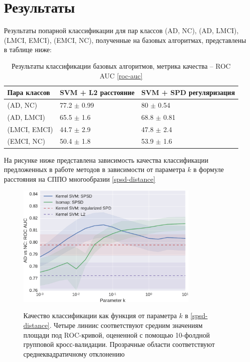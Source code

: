 \chapter{Результаты}
Результаты попарной классификации для пар классов (AD, NC), (AD, LMCI), (LMCI, EMCI), (EMCI, NC), полученные на базовых алгоритмах, представлены в таблице ниже:
\begin{table}[h]
\centering
\begin{tabular}{lll}
\rowcolor[HTML]{EFEFEF} 
\hline
Пара классов & SVM + L2 расстояние & SVM + SPD регуляризация \\
\hline
(AD, NC)     & 77.2 $\pm$ 0.99     & 80 $\pm$ 0.54       \\
(AD, LMCI)   & 65.5 $\pm$ 1.6      & 68.8 $\pm$ 0.81     \\
(LMCI, EMCI) & 44.7 $\pm$ 2.9      & 47.8 $\pm$ 2.4      \\
(EMCI, NC)   & 50.4 $\pm$ 1.8      & 53.9 $\pm$ 1.6     
\end{tabular}
\caption{Результаты классификации базовых алгоритмов, метрика качества – ROC AUC \eqref{roc-auc}}
\end{table}

На рисунке ниже представлена зависимость качества классификации предложенных в работе методов в зависимости от параметра $k$ в формуле расстояния на СППО многообразии \eqref{spsd-distance}
\begin{figure}[h!]
\centering
\includegraphics[width=0.8\textwidth]{img/k_dep.pdf}\label{fig:clf_quality}
\caption{Качество классификации как функция от параметра $k$ в \eqref{spsd-distance}. Четыре линиис соответствуют средним значениям площади под ROC-кривой, оцененной с помощью 10-фолдной групповой кросс-валидации. Прозрачные области соответствуют среднеквадратичному отклонению}
\end{figure}

